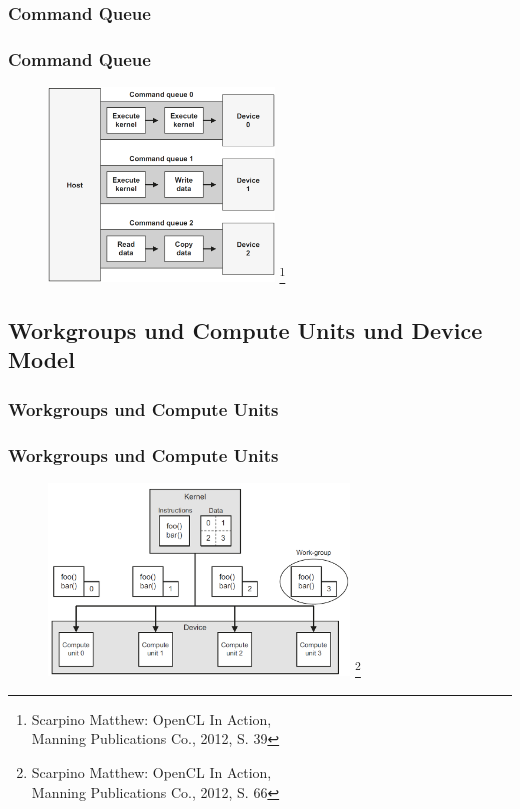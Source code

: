 \documentclass{beamer}
\begin{document}
\subsubsection*{Command Queue}
\begin{frame}
\frametitle{Command Queue}
\begin{figure}
\begin{center}
\includegraphics[width=6cm]{command_queue_manning_p39.PNG}
\footnote{\tiny{Scarpino Matthew: OpenCL In Action, \\Manning Publications Co., 2012, S. 39}}
\end{center}
\end{figure}
\end{frame}

\subsection{Workgroups und Compute Units und Device Model}

\subsubsection*{Workgroups und Compute Units}
\begin{frame}
\frametitle{Workgroups und Compute Units}
\begin{figure}
\begin{center}
\includegraphics[width=8cm]{workgroups_to_compute_units_manning_p66.PNG}
\footnote{\tiny{Scarpino Matthew: OpenCL In Action, \\Manning Publications Co., 2012, S. 66}}
\end{center}
\end{figure}
\end{frame}
\end{document}
